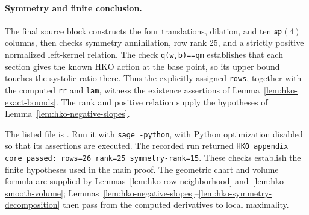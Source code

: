 

\paragraph{Symmetry and finite conclusion.}
The final source block constructs the four translations, dilation, and ten
$\mathfrak{sp}(4)$ columns, then checks symmetry annihilation, row rank 25,
and a strictly positive normalized left-kernel relation. The check
\texttt{q(w,b)==qm} establishes that each section gives the known HKO action
at the base point, so its upper bound touches the systolic ratio there.
Thus the explicitly assigned \texttt{rows}, together with the computed
\texttt{rr} and \texttt{lam}, witness the existence assertions of
Lemma~\ref{lem:hko-exact-bounds}. The rank and positive relation supply the
hypotheses of Lemma~\ref{lem:hko-negative-slopes}.



The listed file is .
Run it with \texttt{sage -python}, with Python optimization disabled so that
its assertions are executed. The recorded run returned
\texttt{HKO appendix core passed: rows=26 rank=25 symmetry-rank=15}.
These checks establish the finite hypotheses used in the main proof. The
geometric chart and volume formula are supplied by
Lemmas~\ref{lem:hko-row-neighborhood} and~\ref{lem:hko-smooth-volume};
Lemmas~\ref{lem:hko-negative-slopes}--\ref{lem:hko-symmetry-decomposition}
then pass from the computed derivatives to local maximality.
